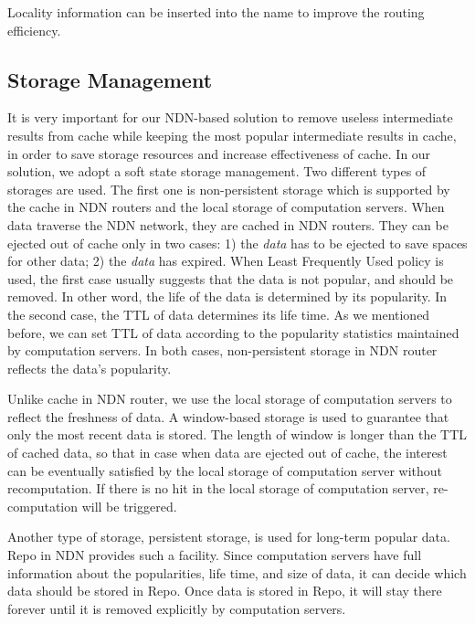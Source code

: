 Locality information can be inserted into the name to improve the routing efficiency. 

\subsection{Storage Management} \label{sec:gg}
It is very important for our NDN-based solution to remove useless intermediate results from cache while keeping the most popular intermediate results in cache, in order to save storage resources and increase effectiveness of cache.  
In our solution, we adopt a soft state storage management. 
Two different types of storages are used.
The first one is non-persistent storage which is supported by the cache in NDN routers and the local storage of computation servers.
When {\sc data} traverse the NDN network, they are cached in NDN routers. 
They can be ejected out of cache only in two cases:
1) the {\it data} has to be ejected to save spaces for other data;
2) the {\it data} has expired.
When Least Frequently Used policy is used, the first case usually suggests that the {\sc data} is not popular, and should be removed.
In other word, the life of the {\sc data} is determined by its popularity.
In the second case, the TTL of {\sc data} determines its life time. 
As we mentioned before, we can set TTL of {\sc data} according to the popularity statistics maintained by computation servers. 
In both cases, non-persistent storage in NDN router reflects the data's popularity.

Unlike cache in NDN router, we use the local storage of computation servers to reflect the freshness of data. 
A window-based storage is used to guarantee that only the most recent data is stored.
The length of window is longer than the TTL of cached data, so that in case when data are ejected out of cache, 
the {\sc interest} can be eventually satisfied by the local storage of computation server without recomputation.
If there is no hit in the local storage of computation server, re-computation will be triggered.

Another type of storage, persistent storage, is used for long-term popular data.
Repo in NDN provides such a facility. 
Since computation servers have full information about the popularities, life time, and size of data, it can decide which data should be stored in Repo. 
Once data is stored in Repo, it will stay there forever until it is removed explicitly by computation servers.
